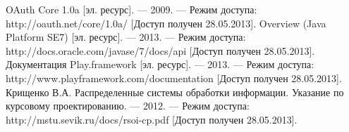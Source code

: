 %




\begin{thebibliography}{4}
OAuth Core 1.0a [эл. ресурс]. — 2009. — Режим доступа: http://oauth.net/core/1.0a/ [Доступ получен 28.05.2013].
Overview (Java Platform SE7) [эл. ресурс]. — 2013. — Режим доступа: http://docs.oracle.com/javase/7/docs/api [Доступ получен 28.05.2013].
Документация Play.framework [эл. ресурс]. — 2013. — Режим доступа: http://www.playframework.com/documentation [Доступ получен 28.05.2013].
Крищенко В.А. Распределенные системы обработки информации. Указание по курсовому проектированию. — 2012. — Режим доступа: http://mstu.sevik.ru/docs/rsoi-cp.pdf [Доступ получен 28.05.2013].
\end{thebibliography}

